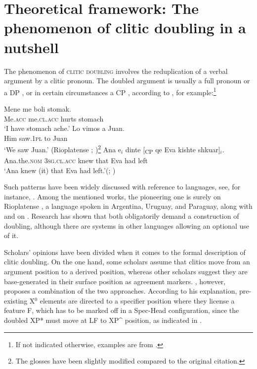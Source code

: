 \documentclass[output=paper,
colorlinks,
citecolor=brown,
newtxmath
]{langscibook}
\begin{document}

\section{Theoretical framework: The phenomenon of clitic doubling in a nutshell}\label{sec:framework}
The phenomenon of \textsc{clitic doubling} involves the reduplication of a verbal argument by a clitic pronoun. The doubled argument is usually a full pronoun  or a DP , or in certain circumstances a CP , according to \citet[1--4]{Kallulli.Tasmowski2008}, for example:\footnote{If not indicated otherwise, examples are from .}


\ea\label{ex:zivojinovic:1}
\gll Mene me boli stomak. \\
     Me.\textsc{acc} me.\textsc{cl.acc} hurts stomach \\
\glt `I have stomach ache.'
\ex\label{ex:zivojinovic:2}
\gll Lo	vimos a Juan.\\
     Him saw.\textsc{1pl}	to Juan \\
\glt `We saw Juan.' \hfill (Rioplatense ; \citealt[32]{Jaeggli1986})\footnote{The glosses have been slightly modified compared to the original citation.}
\ex\label{ex:zivojinovic:3}
\gll Ana	e$_i$ dinte	[\textsubscript{CP} qe Eva kishte shkuar]$_i$.
\\
     Ana.the.\textsc{nom} \textsc{3sg.cl.acc} knew {} that Eva had left\\
\glt `Ana knew (it) that Eva had left.'\hfill (; \citealt[2]{Kallulli.Tasmowski2008})
\z

\noindent Such patterns have been widely discussed with reference to  languages, see, for instance, \citet{Jaeggli1982, Jaeggli1986, Kayne1991, Sportiche1996}. Among the mentioned works, the pioneering one is surely \citet{Jaeggli1982} on Rioplatense , a language spoken in Argentina, Uruguay, and Paraguay, along with \citet{Farkas1978} and \citet{Steriade1980} on . Research has shown that both obligatorily demand a construction of doubling, although there are systems in other languages allowing an optional use of it.

Scholars' opinions have been divided when it comes to the formal description of clitic doubling. On the one hand, some scholars assume that clitics move from an argument position to a derived position, whereas other scholars suggest they are base-generated in their surface position as agreement markers. \citet{Sportiche1996}, however, proposes a combination of the two approaches. According to his explanation, pre-existing X$^{0}$ elements are directed to a specifier position where they license a feature F, which has to be marked off in a Spec-Head configuration, since the doubled XP* must move at LF to XP\^{} position, as indicated in .
\end{document}
